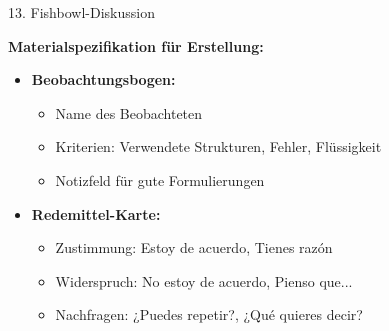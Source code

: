 \documentclass[11pt, a4paper]{article}
\begin{document}
\begin{methode}{13. Fishbowl-Diskussion}
\begin{materialbox}
\textbf{Materialspezifikation für Erstellung:}
\begin{itemize}[leftmargin=*]
    \item \textbf{Beobachtungsbogen:}
    \begin{itemize}
        \item Name des Beobachteten
        \item Kriterien: Verwendete Strukturen, Fehler, Flüssigkeit
        \item Notizfeld für gute Formulierungen
    \end{itemize}
    \item \textbf{Redemittel-Karte:}
    \begin{itemize}
        \item Zustimmung: Estoy de acuerdo, Tienes razón
        \item Widerspruch: No estoy de acuerdo, Pienso que...
        \item Nachfragen: ¿Puedes repetir?, ¿Qué quieres decir?
    \end{itemize}
\end{itemize}
\end{materialbox}

\end{methode}

\vspace{1em}
\end{document}
